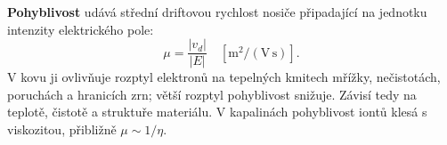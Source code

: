 \textbf{Pohyblivost} udává střední driftovou rychlost nosiče připadající na jednotku intenzity elektrického pole:
\[\boxed{\mu=\frac{|v_d|}{|E|}}\quad[\mathrm{m^2/(V\,s)}].\]
V kovu ji ovlivňuje rozptyl elektronů na tepelných kmitech mřížky, nečistotách, poruchách a hranicích zrn; větší rozptyl pohyblivost snižuje. Závisí tedy na teplotě, čistotě a struktuře materiálu. V kapalinách pohyblivost iontů klesá s viskozitou, přibližně $\mu\sim1/\eta$.
